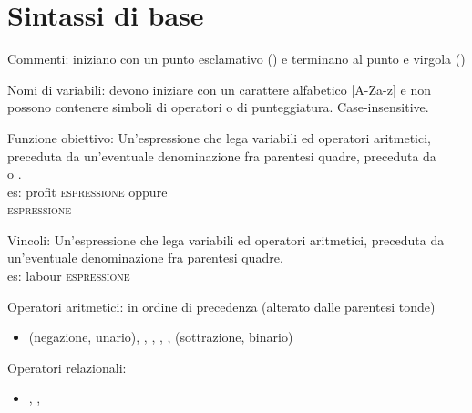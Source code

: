 \documentclass{beamer}
\newcommand{\noun}[1]{\textsc{#1}}
\def\lyxframeend{} %
\begin{document}
\section{Sintassi di base}

\lyxframeend{}

\begin{block}{Commenti:}
iniziano con un punto esclamativo (\structure{!}) e terminano
al punto e virgola (\structure{;})
\end{block}

\begin{block}{Nomi di variabili:}
devono iniziare con un carattere alfabetico {[}A-Za-z{]} e non possono
contenere simboli di operatori o di punteggiatura. Case-insensitive.
\end{block}

\framebreak

\begin{block}{Funzione obiettivo:}
Un'espressione che lega variabili ed operatori aritmetici, preceduta
da un'eventuale denominazione fra parentesi quadre, preceduta da\\
 o .\\
es: \structure{{[}}profit\structure{{]}}  \noun{espressione}
oppure\\
 \noun{espressione}
\end{block}


\begin{block}{Vincoli:}
Un'espressione che lega variabili ed operatori aritmetici, preceduta
da un'eventuale denominazione fra parentesi quadre.\\
es: \structure{{[}}labour\structure{{]}} \noun{espressione}
\end{block}

\framebreak

\begin{block}{Operatori aritmetici:}
 in ordine di precedenza (alterato dalle parentesi
tonde)
\begin{itemize}
\item \structure{-} (negazione, unario), \structure{\textasciicircum{}},
\structure{{*}}, \structure{/}, \structure{+}, \structure{-} (sottrazione,
binario)
\end{itemize}
\end{block}

\begin{block}{Operatori relazionali:}
\begin{itemize}
\item \structure{$>=$}, \structure{$<=$}, \structure{$=$}
\end{itemize}
\end{block}
\end{document}
